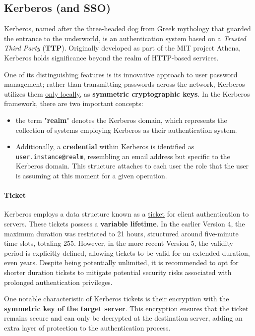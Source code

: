 \subsection{Kerberos (and SSO)}

Kerberos, named after the three-headed dog from Greek mythology that guarded the entrance to the underworld, is an authentication system based on a \textit{Trusted Third Party} (\textbf{TTP}).
Originally developed as part of the MIT project Athena, Kerberos holds significance beyond the realm of HTTP-based services.

One of its distinguishing features is its innovative approach to user password management; rather than transmitting passwords across the network, Kerberos utilizes them \underline{only locally}, as \textbf{symmetric cryptographic keys}.
In the Kerberos framework, there are two important concepts:
\begin{itemize}
  \item the term "\textbf{realm}" denotes the Kerberos domain, which represents the collection of systems employing Kerberos as their authentication system.
  \item Additionally, a \textbf{credential} within Kerberos is identified as \texttt{user.instance@realm}, resembling an email address but specific to the Kerberos domain. This structure attaches to each user the role that the user is assuming at this moment for a given operation.
\end{itemize}


\paragraph{Ticket}
Kerberos employs a data structure known as a \underline{ticket} for client authentication to servers. These tickets possess a \textbf{variable lifetime}. In the earlier Version 4, the maximum duration was restricted to 21 hours, structured around five-minute time slots, totaling 255. However, in the more recent Version 5, the validity period is explicitly defined, allowing tickets to be valid for an extended duration, even years. Despite being potentially unlimited, it is recommended to opt for shorter duration tickets to mitigate potential security risks associated with prolonged authentication privileges.

One notable characteristic of Kerberos tickets is their encryption with the \textbf{symmetric key of the target server}. This encryption ensures that the ticket remains secure and can only be decrypted at the destination server, adding an extra layer of protection to the authentication process.

